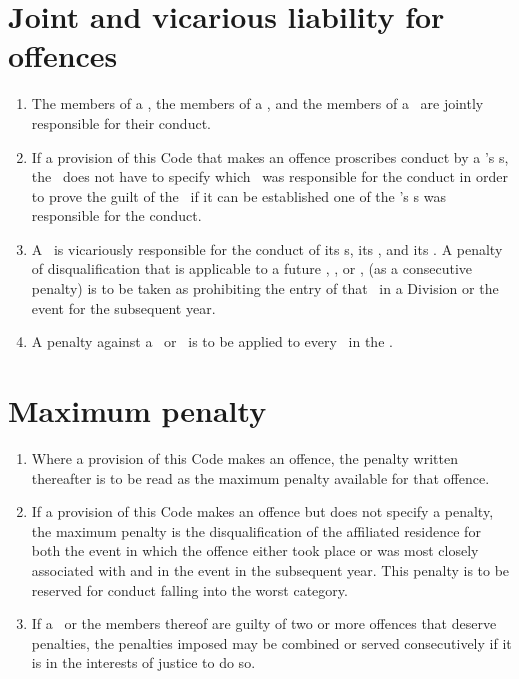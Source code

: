 \documentclass[12pt]{report}
\begin{document}
  \section{Joint and vicarious liability for offences}
  \begin{enumerate}
    \item The members of a \squad, the members of a \team, and the members of a \residence\ are jointly responsible for their conduct.
    \item If a provision of this Code that makes an offence proscribes conduct by a \team's \competitor s, the \Referee\ does not have to specify which \competitor\ was responsible for the conduct in order to prove the guilt of the \team\ if it can be established one of the \team's \competitor s was responsible for the conduct.
    \item A \residence\ is vicariously responsible for the conduct of its \spectator s, its \Coach, and its \President. A penalty of disqualification that is applicable to a future \team, \squad, or \residence, (as a consecutive penalty) is to be taken as prohibiting the entry of that \residence\ in a Division or the event for the subsequent year.
  \item A penalty against a \squad\ or \residence\ is to be applied to every \team\ in the \squad.

  \end{enumerate}
  \section{Maximum penalty}
  \begin{enumerate} \item
  Where a provision of this Code makes an offence, the penalty written thereafter is to be read as the maximum penalty available for that offence.
  \item If a provision of this Code makes an offence but does not specify a penalty, the maximum penalty is the disqualification of the affiliated residence for both the event in which the offence either took place or was most closely associated with and in the event in the subsequent year. This penalty is to be reserved for conduct falling into the worst category.
  \item If a \residence\ or the members thereof are guilty of two or more offences that deserve penalties, the penalties imposed may be combined or served consecutively if it is in the interests of justice to do so.
  \end{enumerate}
\end{document}
